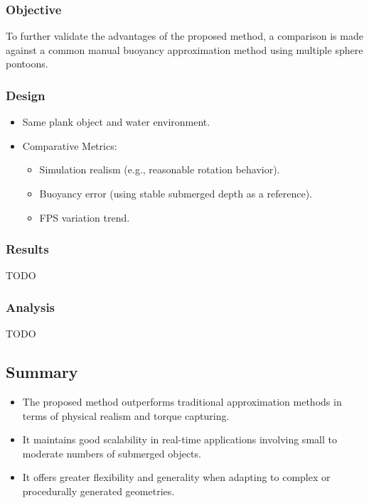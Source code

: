 \subsubsection*{Objective}
To further validate the advantages of the proposed method, a comparison is made against a common manual buoyancy approximation method using multiple sphere pontoons.

\subsubsection*{Design}
\begin{itemize}
		\item Same plank object and water environment.
		\item Comparative Metrics:
		\begin{itemize}
				\item Simulation realism (e.g., reasonable rotation behavior).
				\item Buoyancy error (using stable submerged depth as a reference).
				\item FPS variation trend.
		\end{itemize}
\end{itemize}

\subsubsection*{Results}

{\LARGE\color{red}TODO}

\subsubsection*{Analysis}

{\LARGE\color{red}TODO}

\subsection*{Summary}

\begin{itemize}
		\item The proposed method outperforms traditional approximation methods in terms of physical realism and torque capturing.
		\item It maintains good scalability in real-time applications involving small to moderate numbers of submerged objects.
		\item It offers greater flexibility and generality when adapting to complex or procedurally generated geometries.
\end{itemize}